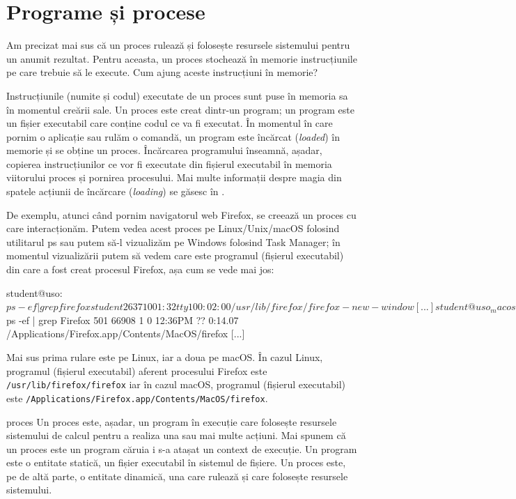 \section{Programe și procese}
\label{sec:procese-v-programe}

Am precizat mai sus că un proces rulează și folosește resursele sistemului
pentru un anumit rezultat. Pentru aceasta, un proces stochează în memorie
instrucțiunile pe care trebuie să le execute. Cum ajung aceste instrucțiuni în
memorie?

Instrucțiunile (numite și codul) executate de un proces sunt puse în memoria sa
în momentul creării sale. Un proces este creat dintr-un program; un program este
un fișier executabil care conține codul ce va fi executat. În momentul în care
pornim o aplicație sau rulăm o comandă, un program este încărcat
(\textit{loaded}) în memorie și se obține un proces. Încărcarea programului
înseamnă, așadar, copierea instrucțiunilor ce vor fi executate din fișierul
executabil în memoria viitorului proces și pornirea procesului. Mai multe
informații despre magia din spatele acțiunii de încărcare (\textit{loading}) se
găsesc în .

De exemplu, atunci când pornim navigatorul web Firefox, se creează un proces cu
care interacționăm. Putem vedea acest proces pe Linux/Unix/macOS folosind
utilitarul ps sau putem să-l vizualizăm pe Windows folosind Task Manager; în
momentul vizualizării putem să vedem care este programul (fișierul executabil)
din care a fost creat procesul Firefox, așa cum se vede mai jos:

\begin{screen}
student@uso:~$ ps -ef | grep firefox
student   2637     1  0 01:32 tty1     00:02:00 /usr/lib/firefox/firefox -new-window
[...]
student@uso_macos:~$ ps -ef | grep Firefox
501 66908     1   0 12:36PM ??         0:14.07 /Applications/Firefox.app/Contents/MacOS/firefox
[...]
\end{screen}

Mai sus prima rulare este pe Linux, iar a doua pe macOS. În cazul Linux, programul (fișierul executabil) aferent procesului Firefox este \texttt{/usr/lib/firefox/firefox} iar în cazul macOS, programul (fișierul executabil) este \texttt{/Applications/Firefox.app/Contents/MacOS/firefox}.

\begin{definition}{proces}
Un proces este, așadar, un program în execuție care folosește resursele
sistemului de calcul pentru a realiza una sau mai multe acțiuni. Mai
spunem că un proces este un program căruia i s-a atașat un context de
execuție. Un program este o entitate statică, un fișier executabil în
sistemul de fișiere. Un proces este, pe de altă parte, o entitate
dinamică, una care rulează și care folosește resursele sistemului.
\end{definition}

